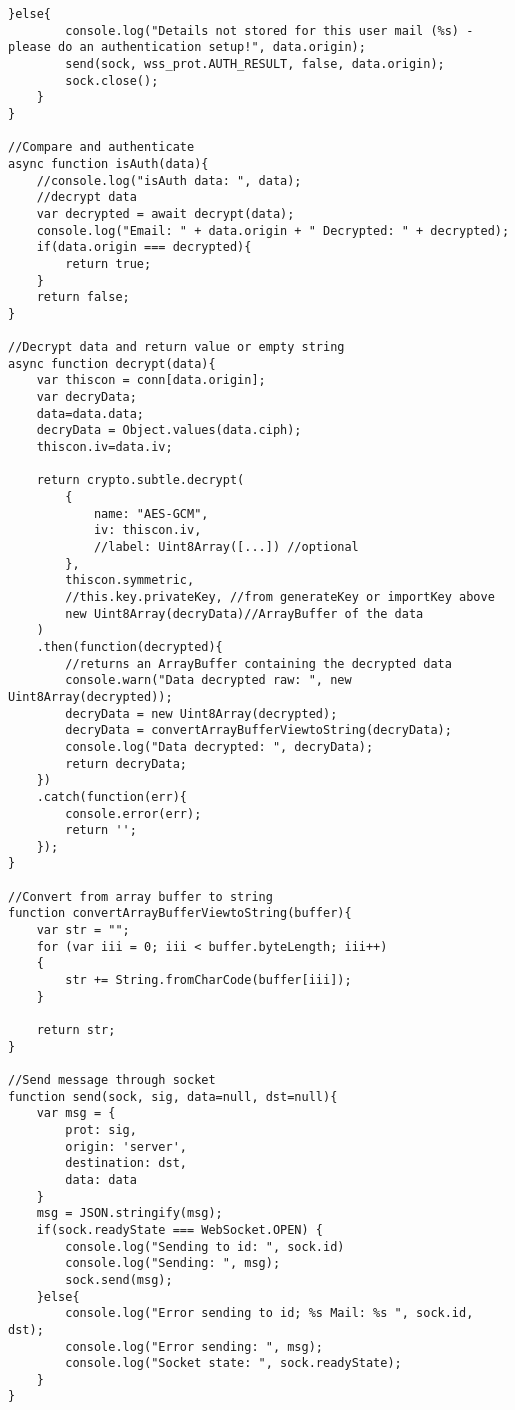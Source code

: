 \begin{lstlisting}[caption=ACS Server, style=htmlcssjs]
	}else{
		console.log("Details not stored for this user mail (%s) - please do an authentication setup!", data.origin);
		send(sock, wss_prot.AUTH_RESULT, false, data.origin);
		sock.close();
	}
}

//Compare and authenticate
async function isAuth(data){
	//console.log("isAuth data: ", data);
	//decrypt data
	var decrypted = await decrypt(data);
	console.log("Email: " + data.origin + " Decrypted: " + decrypted);
	if(data.origin === decrypted){
		return true;
	}
	return false;
}

//Decrypt data and return value or empty string
async function decrypt(data){
	var thiscon = conn[data.origin];
	var decryData;
	data=data.data;
	decryData = Object.values(data.ciph);
	thiscon.iv=data.iv;

	return crypto.subtle.decrypt(
		{
			name: "AES-GCM",
			iv: thiscon.iv,
			//label: Uint8Array([...]) //optional
		},
		thiscon.symmetric,
		//this.key.privateKey, //from generateKey or importKey above
		new Uint8Array(decryData)//ArrayBuffer of the data
	)
	.then(function(decrypted){
		//returns an ArrayBuffer containing the decrypted data
		console.warn("Data decrypted raw: ", new Uint8Array(decrypted));
		decryData = new Uint8Array(decrypted);
		decryData = convertArrayBufferViewtoString(decryData);
		console.log("Data decrypted: ", decryData);
		return decryData;
	})
	.catch(function(err){
		console.error(err);
		return '';
	});
}

//Convert from array buffer to string
function convertArrayBufferViewtoString(buffer){
    var str = "";
    for (var iii = 0; iii < buffer.byteLength; iii++) 
    {
        str += String.fromCharCode(buffer[iii]);
    }

    return str;
}

//Send message through socket
function send(sock, sig, data=null, dst=null){
	var msg = {
		prot: sig,
		origin: 'server',
		destination: dst,
		data: data
	}
	msg = JSON.stringify(msg);
	if(sock.readyState === WebSocket.OPEN) {
		console.log("Sending to id: ", sock.id)
		console.log("Sending: ", msg);
        sock.send(msg);
    }else{
    	console.log("Error sending to id; %s Mail: %s ", sock.id, dst);
    	console.log("Error sending: ", msg);
		console.log("Socket state: ", sock.readyState);
    }
}


\end{lstlisting}

